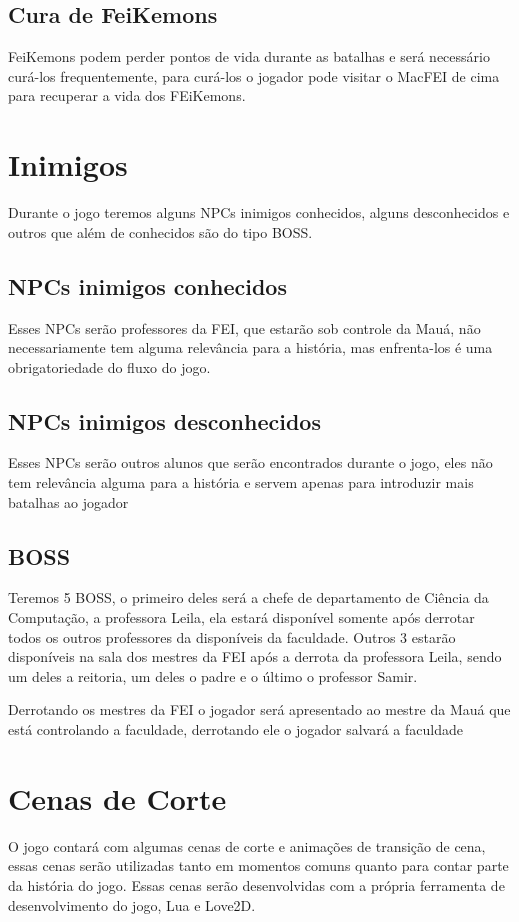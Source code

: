 \documentclass[a4paper,12pt]{article}
\begin{document}
\subsection{Cura de FeiKemons}
FeiKemons podem perder pontos de vida durante as batalhas e será necessário curá-los frequentemente, para curá-los o jogador pode visitar o MacFEI de cima para recuperar a vida dos FEiKemons.

\newpage
\section{Inimigos}
Durante o jogo teremos alguns NPCs inimigos conhecidos, alguns desconhecidos e outros que além de conhecidos são do tipo BOSS.

\subsection{NPCs inimigos conhecidos}
Esses NPCs serão professores da FEI, que estarão sob controle da Mauá, não necessariamente tem alguma relevância para a história, mas enfrenta-los
é uma obrigatoriedade do fluxo do jogo.

\subsection{NPCs inimigos desconhecidos}
Esses NPCs serão outros alunos que serão encontrados durante o jogo, eles não tem relevância alguma para a história e servem apenas para introduzir mais batalhas ao jogador

\subsection{BOSS}
Teremos 5 BOSS, o primeiro deles será a chefe de departamento de Ciência da Computação, a professora Leila, ela estará disponível
somente após derrotar todos os outros professores da disponíveis da faculdade.
Outros 3 estarão disponíveis na sala dos mestres da FEI após a derrota da professora Leila, sendo um deles a reitoria, um deles o padre e o último o professor Samir.

Derrotando os mestres da FEI o jogador será apresentado ao mestre da Mauá que está controlando a faculdade, derrotando ele o jogador salvará a faculdade

\newpage
\section{Cenas de Corte}
O jogo contará com algumas cenas de corte e animações de transição de cena, essas cenas serão utilizadas tanto em momentos comuns quanto para contar
parte da história do jogo. Essas cenas serão desenvolvidas com a própria ferramenta de desenvolvimento do jogo, Lua e Love2D.
\end{document}
